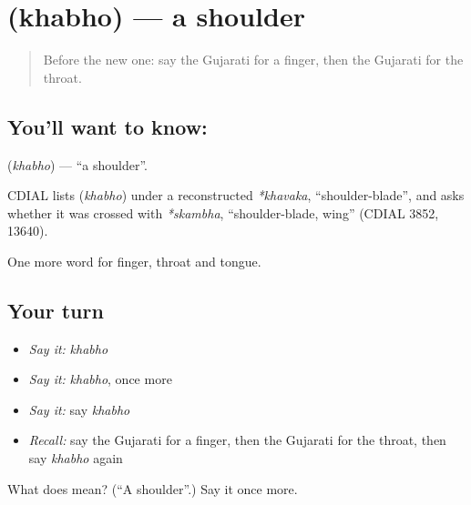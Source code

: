 \section[\texorpdfstring{\gu{ખભો} (khabho)}{ખભો (khabho)}]{ (khabho) — a shoulder}

\label{lesson:GU-C47-shoulder}



\begin{quote}
Before the new one: say the Gujarati for a finger, then the Gujarati for the throat.
\end{quote}

\subsection*{You'll want to know: }
\textbf{} (\emph{khabho}) — \textquotedblleft{}a shoulder\textquotedblright{}.

\begin{cousinweb}
CDIAL lists \textbf{} (\emph{khabho}) under a reconstructed \emph{*khavaka}, \textquotedblleft{}shoulder-blade\textquotedblright{}, and asks whether it was crossed with \emph{*skambha}, \textquotedblleft{}shoulder-blade, wing\textquotedblright{} (CDIAL 3852, 13640).
\end{cousinweb}

\begin{grammarlens}[title={What you've built}]
One more word for finger, throat and tongue.
\end{grammarlens}

\subsection*{Your turn}
\begin{itemize}
\raggedright
  \item \emph{Say it:} \emph{khabho}
  \item \emph{Say it:} \emph{khabho}, once more
  \item \emph{Say it:} say \emph{khabho}
  \item \emph{Recall:} say the Gujarati for a finger, then the Gujarati for the throat, then say \emph{khabho} again
\end{itemize}

\begin{tcolorbox}[breakable,colback=teal!4,colframe=teal!35!black,title={Before you move on}]
What does  mean? (\textquotedblleft{}A shoulder\textquotedblright{}.) Say it once more.
\end{tcolorbox}
